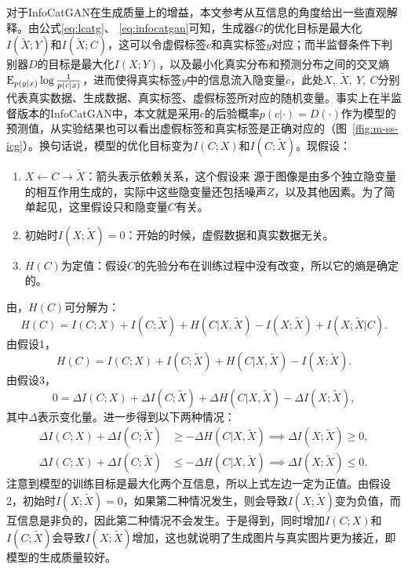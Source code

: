 对于InfoCatGAN在生成质量上的增益，本文参考\citet{spurr2017guiding}从互信息的角度给出一些直观解释。由公式\eqref{eq:lcatg}、 \eqref{eq:infocatgan}可知，生成器$G$的优化目标是最大化$I(\tilde{X}; Y)$和$I(\tilde{X};C)$，这可以令虚假标签$c$和真实标签$y$对应；而半监督条件下判别器$D$的目标是最大化$I(X;Y)$，以及最小化真实分布和预测分布之间的交叉熵$\text{E}_{p(y|x)}\log\frac{1}{p(c|x)}$，进而使得真实标签$y$中的信息流入隐变量$c$，此处$X,~\tilde{X},~Y,~C$分别代表真实数据、生成数据、真实标签、虚假标签所对应的随机变量。事实上在半监督版本的InfoCatGAN中，本文就是采用$c$的后验概率$p(c|\cdot) = D(\cdot)$作为模型的预测值，从实验结果也可以看出虚假标签和真实标签是正确对应的（图~\ref{ffig:m-ss-icg}）。换句话说，模型的优化目标变为$I(C;X)$和$I(C;\tilde{X})$。现假设：
\begin{enumerate}
  \item $X \leftarrow C \rightarrow \tilde{X}$：箭头表示依赖关系，这个假设来 源于图像是由多个独立隐变量的相互作用生成的，实际中这些隐变量还包括噪声$Z$，以及其他因素。为了简单起见，这里假设只和隐变量$C$有关。
  \item 初始时$I(X;\tilde{X})=0$：开始的时候，虚假数据和真实数据无关。
  \item $H(C)$为定值：假设$C$的先验分布在训练过程中没有改变，所以它的熵是确定的。
\end{enumerate}
由\citet{spurr2017guiding}，$H(C)$可分解为：
\[
  H(C) = I(C;X) + I(C;\tilde{X}) + H(C|X,\tilde{X}) - I(X;\tilde{X}) + I(X;\tilde{X}|C).
\]
由假设1，
\[
  H(C) = I(C;X) + I(C;\tilde{X}) + H(C|X,\tilde{X}) - I(X;\tilde{X}).
\]
由假设3，
\[
  0 = \Delta I(C;X) + \Delta I(C;\tilde{X}) + \Delta H(C|X,\tilde{X}) - \Delta I(X;\tilde{X}),
\]
其中$\Delta$表示变化量。进一步得到以下两种情况：
\begin{align}
  \Delta I(C;X) + \Delta I(C;\tilde{X}) &\ge -\Delta H(C|X,\tilde{X}) \implies \Delta I(X;\tilde{X}) \ge 0, \label{case1} \\
  \Delta I(C;X) + \Delta I(C;\tilde{X}) &\le -\Delta H(C|X,\tilde{X}) \implies \Delta I(X;\tilde{X}) \le 0. \label{case2}
\end{align}
注意到模型的训练目标是最大化两个互信息，所以上式左边一定为正值。由假设2，初始时$I(X;\tilde{X})=0$，如果第二种情况发生，则会导致$I(X;\tilde{X})$变为负值，而互信息是非负的，因此第二种情况不会发生。于是得到，同时增加$I(C;X)$和$I(C;\tilde{X})$会导致$I(X;\tilde{X})$增加，这也就说明了生成图片与真实图片更为接近，即模型的生成质量较好。

